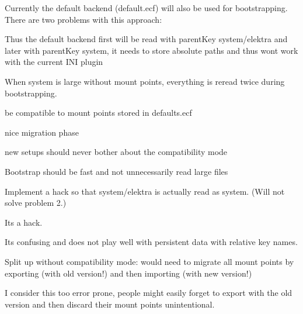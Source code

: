 Currently the default backend (default.\+ecf) will also be used for bootstrapping. There are two problems with this approach\+:


\begin{DoxyEnumerate}
\item Thus the default backend first will be read with parent\+Key {\ttfamily system/elektra} and later with parent\+Key {\ttfamily system}, it needs to store absolute paths and thus won\textquotesingle{}t work with the current I\+NI plugin
\item When {\ttfamily system} is large without mount points, everything is reread twice during bootstrapping.
\end{DoxyEnumerate}


\begin{DoxyItemize}
\item be compatible to mount points stored in {\ttfamily defaults.\+ecf}
\item nice migration phase
\item new setups should never bother about the compatibility mode
\end{DoxyItemize}


\begin{DoxyItemize}
\item Bootstrap should be fast and not unnecessarily read large files
\end{DoxyItemize}


\begin{DoxyItemize}
\item Implement a hack so that {\ttfamily system/elektra} is actually read as {\ttfamily system}. (Will not solve problem 2.)
\begin{DoxyItemize}
\item Its a hack.
\item Its confusing and does not play well with persistent data with relative key names.
\end{DoxyItemize}
\item Split up without compatibility mode\+: would need to migrate all mount points by exporting (with old version!) and then importing (with new version!)
\begin{DoxyItemize}
\item I consider this too error prone, people might easily forget to export with the old version and then discard their mount points unintentional.
\end{DoxyItemize}
\end{DoxyItemize}

